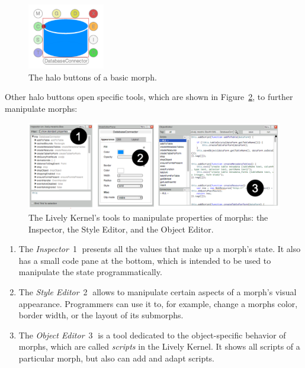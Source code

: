 \begin{figure}[h]
    \centering
    \includegraphics[width=0.3\textwidth]{figures/2_background/1_halos.pdf}
    \caption{The halo buttons of a basic morph.}
    \label{fig:Halos}
\end{figure}

Other halo buttons open specific tools, which are shown in Figure~\ref{fig:LivelyTools}, to further manipulate morphs:

\begin{figure}[h]
    \centering
    \includegraphics[width=\textwidth]{figures/2_background/2_LivelyTools.pdf}
    \caption{The Lively Kernel's tools to manipulate properties of morphs: the Inspector, the Style Editor, and the Object Editor.}
    \label{fig:LivelyTools}
\end{figure}

\begin{enumerate}
    \item The \emph{Inspector}~\textcircled{1} presents all the values that make up a morph's state. It also has a small code pane at the bottom, which is intended to be used to manipulate the state programmatically.
    \item The \emph{Style Editor}~\textcircled{2} allows to manipulate certain aspects of a morph's visual appearance. Programmers can use it to, for example, change a morphs color, border width, or the layout of its submorphs.
    \item The \emph{Object Editor}~\textcircled{3} is a tool dedicated to the object-specific behavior of morphs, which are called \emph{scripts} in the Lively Kernel. It shows all scripts of a particular morph, but also can add and adapt scripts.
\end{enumerate}

